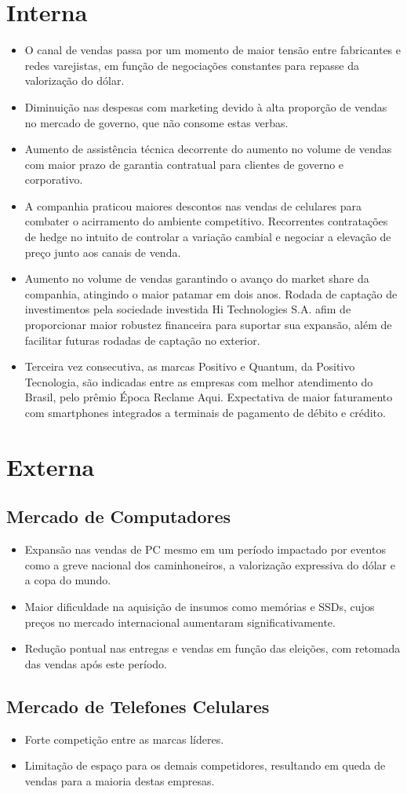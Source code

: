 \section{Interna}

\begin{itemize}
\item O canal de vendas passa por um momento de maior tensão entre fabricantes e redes varejistas, em função de negociações constantes para repasse da valorização do dólar.
\item Diminuição nas despesas com marketing devido à alta proporção de vendas no mercado de governo, que não consome estas verbas.
\item Aumento de assistência técnica decorrente do aumento no volume de vendas com maior prazo de garantia contratual para clientes de governo e corporativo.
\item A companhia praticou maiores descontos nas vendas de celulares para combater o acirramento do ambiente competitivo.
Recorrentes contratações de hedge no intuito de controlar a variação cambial e negociar a elevação de preço junto aos canais de venda.
\item Aumento no volume de vendas garantindo o avanço do market share da companhia, atingindo o maior patamar em dois anos.
Rodada de captação de investimentos pela sociedade investida Hi Technologies S.A. afim de proporcionar maior robustez financeira para suportar sua expansão, além de facilitar futuras rodadas de captação no exterior.
\item Terceira vez consecutiva, as marcas Positivo e Quantum, da Positivo Tecnologia, são indicadas entre as empresas com melhor atendimento do Brasil, pelo prêmio Época Reclame Aqui.
Expectativa de maior faturamento com smartphones integrados a terminais de pagamento de débito e crédito.

\end{itemize}

\section{Externa}
\subsection{Mercado de Computadores}
\begin{itemize}
\item Expansão nas vendas de PC mesmo em um período impactado por eventos como a greve nacional dos caminhoneiros, a valorização expressiva do dólar e a copa do mundo.
\item Maior dificuldade na aquisição de insumos como memórias e SSDs, cujos preços no mercado internacional aumentaram significativamente.
\item Redução pontual nas entregas e vendas em função das eleições, com retomada das vendas após este período.
\end{itemize}

\subsection{Mercado de Telefones Celulares}
\begin {itemize}
\item Forte competição entre as marcas líderes.
\item Limitação de espaço para os demais competidores, resultando em queda de vendas para a maioria destas empresas.
\end{itemize}
